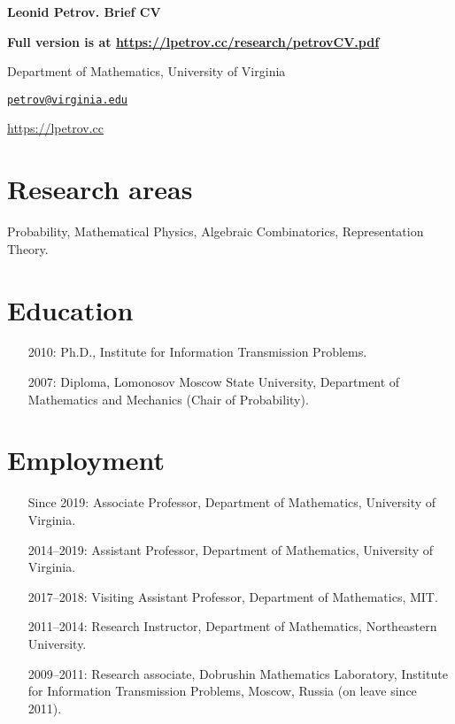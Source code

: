 \documentclass[letterpaper,11pt]{article}
\def\name{Leonid Petrov}
\begin{document}
\centerline{\huge \bf \name . Brief CV}
\bigskip

\textbf{Full version is at \url{https://lpetrov.cc/research/petrovCV.pdf}}

\noindent\hrulefill

\vspace{0.25in}

Department of Mathematics, University of Virginia

\href{mailto:petrov@virginia.edu}{\tt petrov@virginia.edu}

\url{https://lpetrov.cc}

\section*{Research areas}

Probability, Mathematical Physics, Algebraic Combinatorics, Representation
Theory.

\section*{Education}

\begin{itemize}
	\item [2010:]
		Ph.D., 
		Institute for Information Transmission Problems.

	\item [2007:]
		Diploma,
		Lomonosov Moscow State University,
		Department of Mathematics and Mechanics (Chair of Probability).
\end{itemize}

\section*{Employment}

\begin{itemize}
	\item
	      [Since 2019:]
	      Associate Professor, Department of Mathematics, University
		  of Virginia.
	\item
	      [2014--2019:]
				Assistant Professor, Department of Mathematics, University
				of Virginia.
	\item
	      [2017--2018:]
				Visiting Assistant Professor, Department of Mathematics, MIT.
	\item
	      [2011--2014:]
				Research Instructor, Department of Mathematics, Northeastern
				University.
	\item
	      [2009--2011:]
				Research associate, Dobrushin Mathematics Laboratory,
	      Institute for Information Transmission Problems, Moscow, Russia (on leave
	      since 2011).
\end{itemize}
\end{document}
